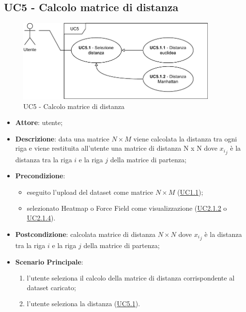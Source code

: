 \subsection{UC5 - Calcolo matrice di distanza}
    \label{uc5}
    
    \begin{figure}[htbp]
        \centering
        \includegraphics[width=0.9\textwidth]{source/sections/casi-uso/diagrams/uc5.pdf}
        \caption{UC5 - Calcolo matrice di distanza}
        \label{fig:uc5}
    \end{figure}
    
    \begin{itemize}
    \item \textbf{Attore}: utente;
    \item \textbf{Descrizione}: data una matrice $N \times M$ viene calcolata la distanza tra ogni riga e viene restituita all'utente una matrice di distanza N x N dove ${x_i}_j$ è la distanza tra la riga $i$ e la riga $j$ della matrice di partenza;
    \item \textbf{Precondizione}: 
    \begin{itemize}
        \item eseguito l'upload del dataset come matrice $N\times M$ (\hyperref[uc1.1]{UC1.1});
        \item selezionato Heatmap o Force Field come visualizzazione (\hyperref[uc2.1.2]{UC2.1.2} o \hyperref[uc2.1.4]{UC2.1.4}).
    \end{itemize}  
    \item \textbf{Postcondizione}: calcolata matrice di distanza $N \times N$ dove ${x_i}_j$ è la distanza tra la riga $i$ e la riga $j$ della matrice di partenza;
    \item \textbf{Scenario Principale}: 
    \begin{enumerate}
        \item l'utente seleziona il calcolo della matrice di distanza corrispondente al dataset caricato;
        \item l'utente seleziona la distanza (\hyperref[uc5.1]{UC5.1}).
    \end{enumerate}
    \end{itemize}
    
